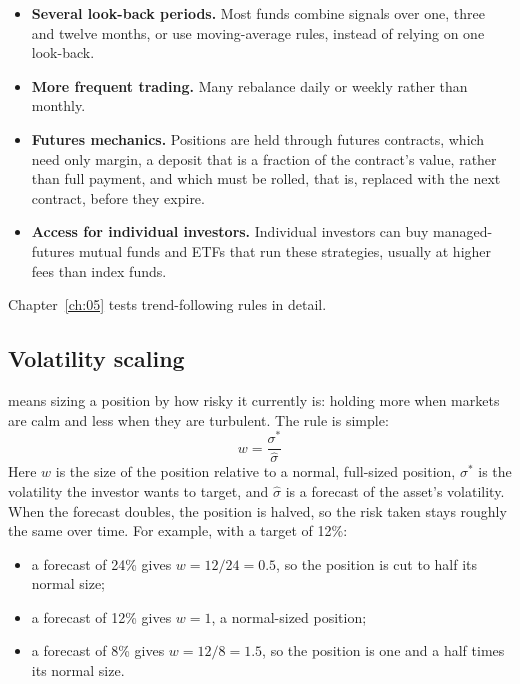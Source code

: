 \begin{itemize}
  \item \textbf{Several look-back periods.} Most funds combine signals over one, three and twelve months, or use moving-average rules, instead of relying on one look-back.
  \item \textbf{More frequent trading.} Many rebalance daily or weekly rather than monthly.
  \item \textbf{Futures mechanics.} Positions are held through futures contracts, which need only margin, a deposit that is a fraction of the contract's value, rather than full payment, and which must be rolled, that is, replaced with the next contract, before they expire.
  \item \textbf{Access for individual investors.} Individual investors can buy managed-futures mutual funds and ETFs that run these strategies, usually at higher fees than index funds.
\end{itemize}

Chapter~\ref{ch:05} tests trend-following rules in detail.


\subsection{Volatility scaling}

 means sizing a position by how risky it currently is: holding more when markets are calm and less when they are turbulent. The rule is simple:
\begin{equation}
  w = \frac{\sigma^*}{\hat\sigma}
  \label{eq:05-volscale}
\end{equation}
Here $w$ is the size of the position relative to a normal, full-sized position, $\sigma^*$ is the volatility the investor wants to target, and $\hat\sigma$ is a forecast of the asset's volatility. When the forecast doubles, the position is halved, so the risk taken stays roughly the same over time. For example, with a target of 12\%:

\begin{itemize}
  \item a forecast of 24\% gives $w = 12/24 = 0.5$, so the position is cut to half its normal size;
  \item a forecast of 12\% gives $w = 1$, a normal-sized position;
  \item a forecast of 8\% gives $w = 12/8 = 1.5$, so the position is one and a half times its normal size.
\end{itemize}

